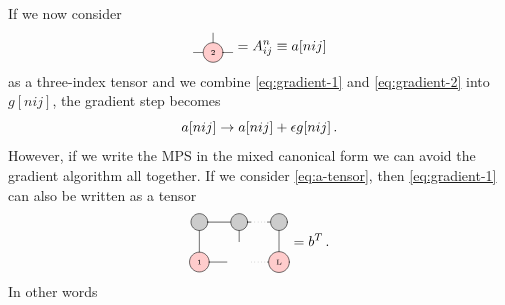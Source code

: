 \documentclass[twoside,twocolumn,9pt]{article}
\begin{document}
If we now consider 
\begin{equation}
  \begin{tikzpicture}[baseline={([yshift=-.5ex]current bounding box.center)}]
    \draw[gray, thick] (0,0) -- (1,0);
    \draw[gray, thick] (0.5,0) -- (0.5,0.5);
    \node[draw, circle, line cap=round, fill=red!20] at (0.5,0) {\tiny 2};
  \end{tikzpicture} = A^n_{ij} \equiv a[nij] 
\end{equation}
as a three-index tensor and we combine \cref{eq:gradient-1} and \cref{eq:gradient-2} into $g[nij]$, the gradient step becomes
\begin{equation}\label{eq:a-tensor}
  a[nij] \rightarrow a[nij] + \epsilon g[nij] \thinspace .
\end{equation}
However, if we write the MPS in the mixed canonical form we can avoid the gradient algorithm all together. If we consider \cref{eq:a-tensor}, then \cref{eq:gradient-1} can also be written as a tensor
\begin{equation}\label{eq:gradient-1-as-tensor}
  \begin{tikzpicture}[baseline={([yshift=-.5ex]current bounding box.center)}]
    \draw[gray, thick] (0,0) -- (0,-1);
    \draw[gray, thick] (1,0) -- (1,-0.5);
    \draw[gray, thick] (2,0) -- (2,-1);

    \draw[gray, thick] (0,0) -- (1.3,0);
    \draw[gray, dotted] (1.3,0) -- (1.7,0);
    \draw[gray, thick] (1.7,0) -- (2.0,0);

    \draw[gray, thick] (0,-1) -- (0.7,-1);
    \draw[gray, dotted] (1.3,-1) -- (1.7,-1);
    \draw[gray, thick] (1.7,-1) -- (2.0,-1);

    \node[draw, circle, line cap=round, fill=black!20, minimum size=12] at (0,0) {  };
    \node[draw, circle, line cap=round, fill=black!20, minimum size=12] at (1,0) {  };
    \node[draw, circle, line cap=round, fill=black!20, minimum size=12] at (2,0) {  };

    \node[draw, circle, line cap=round, fill=red!20] at (0,-1) {\tiny 1};
    \node[draw, circle, line cap=round, fill=red!20] at (2,-1) {\tiny L};
  \end{tikzpicture} = b^T \thinspace .
\end{equation} 
In other words 
\end{document}
